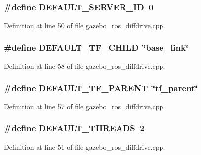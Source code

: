 \subsubsection[{DEFAULT\_\-SERVER\_\-ID}]{\setlength{\rightskip}{0pt plus 5cm}\#define DEFAULT\_\-SERVER\_\-ID~0}\label{gazebo__ros__diffdrive_8cpp_a0ff9a709a4374667951fb31163003661}


Definition at line 50 of file gazebo\_\-ros\_\-diffdrive.cpp.

\subsubsection[{DEFAULT\_\-TF\_\-CHILD}]{\setlength{\rightskip}{0pt plus 5cm}\#define DEFAULT\_\-TF\_\-CHILD~\char`\"{}base\_\-link\char`\"{}}\label{gazebo__ros__diffdrive_8cpp_a0358705c8694284d288f0187e0d011c4}


Definition at line 58 of file gazebo\_\-ros\_\-diffdrive.cpp.

\subsubsection[{DEFAULT\_\-TF\_\-PARENT}]{\setlength{\rightskip}{0pt plus 5cm}\#define DEFAULT\_\-TF\_\-PARENT~\char`\"{}tf\_\-parent\char`\"{}}\label{gazebo__ros__diffdrive_8cpp_a5b1a3d3c086515db97209ceaafa98159}


Definition at line 57 of file gazebo\_\-ros\_\-diffdrive.cpp.

\subsubsection[{DEFAULT\_\-THREADS}]{\setlength{\rightskip}{0pt plus 5cm}\#define DEFAULT\_\-THREADS~2}\label{gazebo__ros__diffdrive_8cpp_af3f16d9b8a1ac1802eea6524155052c9}


Definition at line 51 of file gazebo\_\-ros\_\-diffdrive.cpp.

